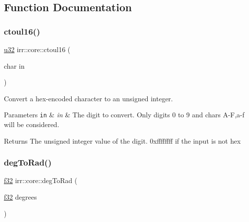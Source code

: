 \subsection{Function Documentation}
\mbox{\label{namespaceirr_1_1core_a8b818c2189b834bffacd522ff752c3a6}} 
\subsubsection{\texorpdfstring{ctoul16()}{ctoul16()}}
{\footnotesize\ttfamily \hyperlink{namespaceirr_a0416a53257075833e7002efd0a18e804}{u32} irr\+::core\+::ctoul16 (\begin{DoxyParamCaption}\item[{char}]{in }\end{DoxyParamCaption})\hspace{0.3cm}{\ttfamily [inline]}}



Convert a hex-\/encoded character to an unsigned integer. 


\begin{DoxyParams}[1]{Parameters}
\mbox{\tt in}  & {\em in} & The digit to convert. Only digits 0 to 9 and chars A-\/F,a-\/f will be considered. \\
\hline
\end{DoxyParams}
\begin{DoxyReturn}{Returns}
The unsigned integer value of the digit. 0xffffffff if the input is not hex 
\end{DoxyReturn}
\mbox{\label{namespaceirr_1_1core_ad58b3d0e755a4f25ad19d5f5d4fb0280}} 
\subsubsection{\texorpdfstring{deg\+To\+Rad()}{degToRad()}\hspace{0.1cm}{\footnotesize\ttfamily [1/2]}}
{\footnotesize\ttfamily \hyperlink{namespaceirr_a0277be98d67dc26ff93b1a6a1d086b07}{f32} irr\+::core\+::deg\+To\+Rad (\begin{DoxyParamCaption}\item[{\hyperlink{namespaceirr_a0277be98d67dc26ff93b1a6a1d086b07}{f32}}]{degrees }\end{DoxyParamCaption})\hspace{0.3cm}{\ttfamily [inline]}}



